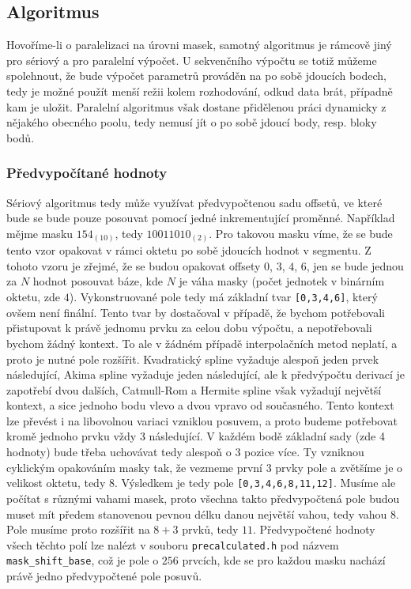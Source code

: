 \documentclass[]{thesiskiv}
\begin{document}
\subsection{Algoritmus}\label{algo:impl}

Hovoříme-li o paralelizaci na úrovni masek, samotný algoritmus je rámcově jiný pro sériový a pro paralelní výpočet. U sekvenčního výpočtu se totiž můžeme spolehnout, že bude výpočet parametrů prováděn na po sobě jdoucích bodech, tedy je možné použít menší režii kolem rozhodování, odkud data brát, případně kam je uložit. Paralelní algoritmus však dostane přidělenou práci dynamicky z nějakého obecného poolu, tedy nemusí jít o po sobě jdoucí body, resp. bloky bodů.

\subsubsection*{Předvypočítané hodnoty}

Sériový algoritmus tedy může využívat předvypočtenou sadu offsetů, ve které bude se bude pouze posouvat pomocí jedné inkrementující proměnné. Například mějme masku $154_{(10)}$, tedy $10011010_{(2)}$. Pro takovou masku víme, že se bude tento vzor opakovat v rámci oktetu po sobě jdoucích hodnot v segmentu. Z tohoto vzoru je zřejmé, že se budou opakovat offsety $0$, $3$, $4$, $6$, jen se bude jednou za $N$ hodnot posouvat báze, kde $N$ je váha masky (počet jednotek v binárním oktetu, zde $4$). Vykonstruované pole tedy má základní tvar \texttt{[0,3,4,6]}, který ovšem není finální. Tento tvar by dostačoval v případě, že bychom potřebovali přistupovat k právě jednomu prvku za celou dobu výpočtu, a nepotřebovali bychom žádný kontext. To ale v žádném případě interpolačních metod neplatí, a proto je nutné pole rozšířit. Kvadratický spline vyžaduje alespoň jeden prvek následující, Akima spline vyžaduje jeden následující, ale k předvýpočtu derivací je zapotřebí dvou dalších, Catmull-Rom a Hermite spline však vyžadují největší kontext, a sice jednoho bodu vlevo a dvou vpravo od současného. Tento kontext lze převést i na libovolnou variaci vzniklou posuvem, a proto budeme potřebovat kromě jednoho prvku vždy 3 následující. V každém bodě základní sady (zde 4 hodnoty) bude třeba uchovávat tedy alespoň o 3 pozice více. Ty vzniknou cyklickým opakováním masky tak, že vezmeme první 3 prvky pole a zvětšíme je o velikost oktetu, tedy $8$. Výsledkem je tedy pole \texttt{[0,3,4,6,8,11,12]}. Musíme ale počítat s různými vahami masek, proto všechna takto předvypočtená pole budou muset mít předem stanovenou pevnou délku danou největší vahou, tedy vahou $8$. Pole musíme proto rozšířit na $8 + 3$ prvků, tedy $11$. Předvypočtené hodnoty všech těchto polí lze nalézt v souboru \texttt{precalculated.h} pod názvem \texttt{mask\_shift\_base}, což je pole o $256$ prvcích, kde se pro každou masku nachází právě jedno předvypočtené pole posuvů.
\end{document}

